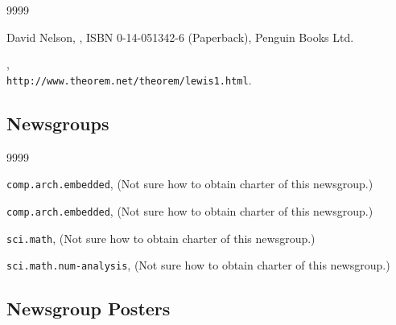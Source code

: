 \begin{thecustombibliography}{9999}

David Nelson,
,
ISBN 0-14-051342-6 (Paperback),
Penguin Books Ltd.

, \\
\texttt{http://www.theorem.net/theorem/lewis1.html}.

\end{thecustombibliography}


\subsection*{Newsgroups}

\begin{thecustombibliography}{9999}

\texttt{comp.arch.embedded}, (Not sure how to obtain charter of this newsgroup.)

\texttt{comp.arch.embedded}, (Not sure how to obtain charter of this newsgroup.)

\texttt{sci.math}, (Not sure how to obtain charter of this newsgroup.)

\texttt{sci.math.num-analysis}, (Not sure how to obtain charter of this newsgroup.)

\end{thecustombibliography}



\subsection*{Newsgroup Posters}

